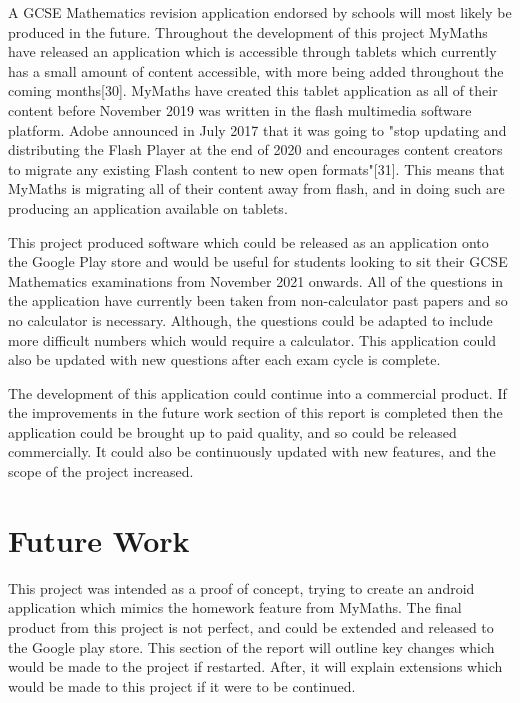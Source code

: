 \documentclass{article}
\begin{document}
A GCSE Mathematics revision application endorsed by schools will most likely be produced in the future. Throughout the development of this project MyMaths have released an application which is accessible through tablets which currently has a small amount of content accessible, with more being added throughout the coming months[30]. MyMaths have created this tablet application as all of their content before November 2019 was written in the flash multimedia software platform. Adobe announced in July 2017 that it was going to "stop updating and distributing the Flash Player at the end of 2020 and encourages content creators to migrate any existing Flash content to new open formats"[31]. This means that MyMaths is migrating all of their content away from flash, and in doing such are producing an application available on tablets. \par

This project produced software which could be released as an application onto the Google Play store and would be useful for students looking to sit their GCSE Mathematics examinations from November 2021 onwards. All of the questions in the application have currently been taken from non-calculator past papers and so no calculator is necessary. Although, the questions could be adapted to include more difficult numbers which would require a calculator. This application could also be updated with new questions after each exam cycle is complete. \par

The development of this application could continue into a commercial product. If the improvements in the future work section of this report is completed then the application could be brought up to paid quality, and so could be released commercially. It could also be continuously updated with new features, and the scope of the project increased. \par

\section{Future Work}
\label{section:futureWork}

This project was intended as a proof of concept, trying to create an android application which mimics the homework feature from MyMaths. The final product from this project is not perfect, and could be extended and released to the Google play store. This section of the report will outline key changes which would be made to the project if restarted. After, it will explain extensions which would be made to this project if it were to be continued. \par
\end{document}

